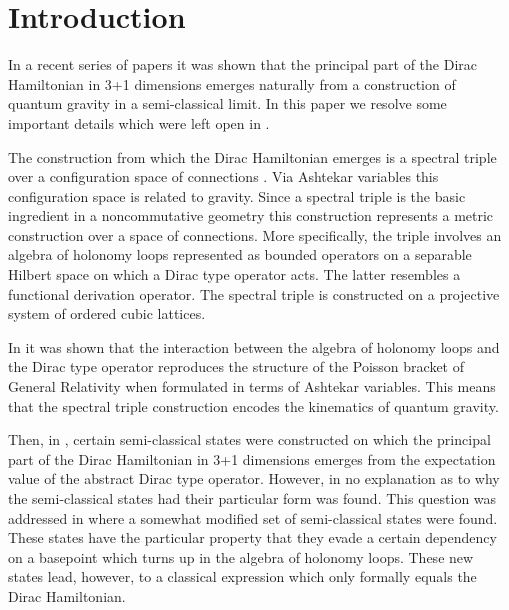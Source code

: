 \documentclass[12pt]{article}
\begin{document}
\newpage




\newpage




\section{Introduction}

In a recent series of papers \cite{AGNP1,Aastrup:2009dy,Aastrup:2010kb} it was shown that the principal part of the Dirac Hamiltonian in 3+1 dimensions emerges naturally from a construction of quantum gravity in a semi-classical limit. In this paper we resolve some important details which were left open in \cite{Aastrup:2010kb}. 

The construction from which the Dirac Hamiltonian emerges is a spectral triple over a configuration space of connections \cite{AGN3,AGN1,AGN2,Aastrup:2005yk}. Via Ashtekar variables \cite{Ashtekar:1986yd,Ashtekar:1987gu} this configuration space is related to gravity. Since a spectral triple is the basic ingredient in a noncommutative geometry this construction represents a metric construction over a space of connections. More specifically, the triple involves an algebra of holonomy loops represented as bounded operators on a separable Hilbert space on which a Dirac type operator acts. The latter resembles a functional derivation operator. The spectral triple is constructed on a projective system of ordered cubic lattices.

In \cite{AGNP1,AGN2} it was shown that the interaction between the algebra of holonomy loops and the Dirac type operator reproduces the structure of the Poisson bracket of General Relativity when formulated in terms of Ashtekar variables. This means that the spectral triple construction encodes the kinematics of quantum gravity. 

Then, in  \cite{AGNP1}, certain semi-classical states were constructed on which the principal part of the Dirac Hamiltonian in 3+1 dimensions emerges from the expectation value of the abstract Dirac type operator. However, in  \cite{AGNP1} no explanation as to why the semi-classical states had their particular form was found.  This question was addressed in \cite{Aastrup:2010kb} where a somewhat modified set of semi-classical states were found. These states have the particular property that they evade a certain dependency on a basepoint which turns up in the algebra of holonomy loops. These new states lead, however, to a classical expression which only formally equals the Dirac Hamiltonian.
\end{document}
